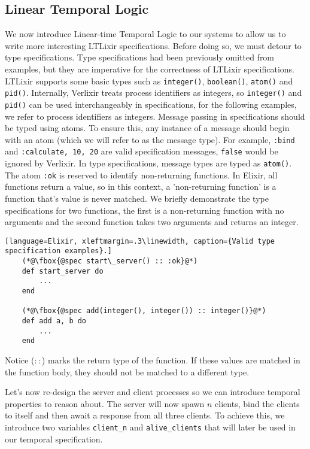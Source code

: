 \subsection{Linear Temporal Logic}
We now introduce Linear-time Temporal Logic to our systems to allow us to write more interesting LTLixir specifications. Before doing so, we must detour to type specifications. Type specifications had been previously omitted from examples, but they are imperative for the correctness of LTLixir specifications. LTLixir supports some basic types such as \texttt{integer()}, \texttt{boolean()}, \texttt{atom()} and \texttt{pid()}. Internally, Verlixir treats process identifiers as integers, so \texttt{integer()} and \texttt{pid()} can be used interchangeably in specifications, for the following examples, we refer to process identifiers as integers. Message passing in specifications should be typed using atoms. To ensure this, any instance of a message should begin with an atom (which we will refer to as the message type). For example, \texttt{{:bind}} and \texttt{{:calculate, 10, 20}} are valid specification messages, \texttt{{false}} would be ignored by Verlixir. In type specifications, message types are typed as \texttt{atom()}. The atom \texttt{:ok} is reserved to identify non-returning functions. In Elixir, all functions return a value, so in this context, a 'non-returning function' is a function that's value is never matched. We briefly demonstrate the type specifications for two functions, the first is a non-returning function with no arguments and the second function takes two arguments and returns an integer.
\begin{lstlisting}[language=Elixir, xleftmargin=.3\linewidth, caption={Valid type specification examples}.]
    (*@\fbox{@spec start\_server() :: :ok}@*)
    def start_server do
        ...
    end

    (*@\fbox{@spec add(integer(), integer()) :: integer()}@*)
    def add a, b do
        ...
    end
\end{lstlisting}
Notice ($::$) marks the return type of the function. If these values are matched in the function body, they should not be matched to a different type.
\par
Let's now re-design the server and client processes so we can introduce temporal properties to reason about. The server will now spawn $n$ clients, bind the clients to itself and then await a response from all three clients. To achieve this, we introduce two variables \texttt{client\_n} and \texttt{alive\_clients} that will later be used in our temporal specification.
